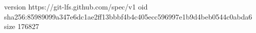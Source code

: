 version https://git-lfs.github.com/spec/v1
oid sha256:85989099a347e6dc1ae2ff13bbbf4b4c405ecc596997e1b9d4beb0544c0abda6
size 176827
